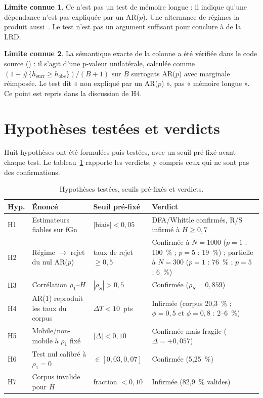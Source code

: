 \documentclass[12pt,a4paper]{report}
\theoremstyle{definition}
\newtheorem{limite}{Limite connue}[chapter]
\DeclareRobustCommand{\code}[1]{\texorpdfstring{\texttt{\detokenize{#1}}}{\detokenize{#1}}}
\begin{document}
\begin{limite}
Ce n'est pas un test de mémoire longue : il indique qu'une dépendance n'est pas expliquée
par un AR($p$). Une alternance de régimes la produit aussi~\cite{diebold2001}. Le test
n'est pas un argument suffisant pour conclure à de la LRD.
\end{limite}

\begin{limite}
La sémantique exacte de la colonne \code{nul_p} a été vérifiée dans le code source
(\code{validation/modeles_nuls.py}) : il s'agit d'une p-valeur unilatérale, calculée
comme $(1 + \#\{h_{\text{surr}} \ge h_{\text{obs}}\}) / (B+1)$ sur $B$ surrogats AR($p$)
avec marginale réimposée. Le test dit « non expliqué par un AR($p$) », pas « mémoire
longue ». Ce point est repris dans la discussion de H4.
\end{limite}

\section{Hypothèses testées et verdicts}
\label{sec:hypotheses}

Huit hypothèses ont été formulées puis testées, avec un seuil pré-fixé avant chaque test.
Le tableau~\ref{tab:hypotheses} rapporte les verdicts, y compris ceux qui ne sont pas des
confirmations.

\begin{table}[ht]
\centering
\caption{Hypothèses testées, seuils pré-fixés et verdicts.}
\label{tab:hypotheses}
\small
\begin{tabular}{p{0.6cm}p{4.6cm}p{2.6cm}p{5cm}}
\toprule
\textbf{Hyp.} & \textbf{Énoncé} & \textbf{Seuil pré-fixé} & \textbf{Verdict} \\
\midrule
H1 & Estimateurs fiables sur fGn & $|\text{biais}| < 0{,}05$ & DFA/Whittle confirmés, R/S infirmé à $H \ge 0{,}7$ \\
H2 & Régime $\to$ rejet du nul AR($p$) & taux de rejet $\ge 0{,}5$ & Confirmée à $N=1000$ ($p=1$ : 100~\% ; $p=5$ : 19~\%) ; partielle à $N=300$ ($p=1$ : 76~\% ; $p=5$ : 6~\%) \\
H3 & Corrélation $\rho_1$--$H$ & $|\rho_S| > 0{,}5$ & Confirmée ($\rho_S = 0{,}859$) \\
H4 & AR(1) reproduit les taux du corpus & $\Delta T < 10$~pts & Infirmée (corpus 20,3~\% ; $\phi=0{,}5$ et $\phi=0{,}8$ : 2--6~\%) \\
H5 & Mobile/non-mobile à $\rho_1$ fixé & $|\Delta| < 0{,}10$ & Confirmée mais fragile ($\Delta = +0{,}057$) \\
H6 & Test nul calibré à $\rho_1 = 0$ & $\in [0{,}03, 0{,}07]$ & Confirmée (5{,}25~\%) \\
H7 & Corpus invalide pour $H$ & fraction $< 0{,}10$ & Infirmée (82{,}9~\% valides) \\
\bottomrule
\end{tabular}
\end{table}
\end{document}
